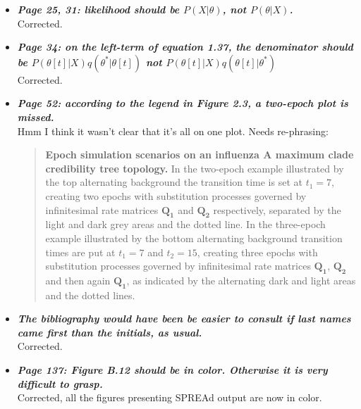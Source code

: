 \documentclass[english]{article}
\begin{document}
\begin{itemize}
\begin{quote}
\myeditDPfive
\end{quote}


\item {
{\it
\textbf{
Page 25, 31: likelihood should be $P(X| \theta)$, not $P(\theta | X)$.
}%
}%
}%
\\
Corrected.


\item {
{\it
\textbf{
Page 34: on the left-term of equation 1.37, the denominator should be
$P(\theta[t]|X) q(\theta^{*} | \theta[t])$
not 
$P(\theta[t]|X) q(\theta[t] | \theta^{*})$
}%
}%
}%
\\
Corrected.


\item {
{\it
\textbf{
Page 52: according to the legend in Figure 2.3, a two-epoch plot is missed.
}%
}%
}%
\\
Hmm I think it wasn't clear that it's all on one plot. Needs re-phrasing:

\begin{quote}
{\bf  Epoch simulation scenarios on an influenza A maximum clade credibility tree topology.} 
In the two-epoch example illustrated by the top alternating background
the transition time is set at $t_{1}=7$, creating two epochs with substitution processes governed by infinitesimal rate matrices $\mathbf{Q_{1}}$ and $\mathbf{Q_{2}}$ respectively, separated by the light and dark grey areas and the dotted line.
In the three-epoch example illustrated 
by the bottom alternating background
transition times are put at $t_{1}=7$ and $t_{2}=15$, creating three epochs with substitution processes governed by infinitesimal rate matrices $\mathbf{Q_{1}}$, $\mathbf{Q_{2}}$ and then again $\mathbf{Q_{1}}$, as indicated by the alternating dark and light areas and the dotted lines.
\end{quote}



\item {
{\it
\textbf{
The bibliography would have been be easier to consult if last names came first than the initials, as usual.
}%
}%
}%
\\
Corrected.


\item {
{\it
\textbf{
Page 137: Figure B.12 should be in color. 
Otherwise it is very difficult to grasp.
}%
}%
}%
\\
Corrected, all the figures presenting SPREAd output are now in color.


\end{itemize}
\end{document}
